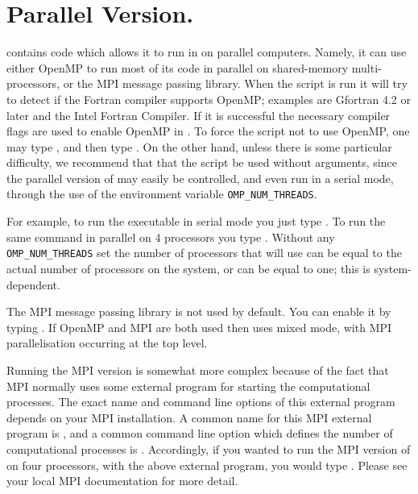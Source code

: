 \documentclass[12pt]{report}
\begin{document}
\section{ Parallel Version.} \label{sec:Parallel}
\AUTO contains code which allows
it to run in on parallel computers.  Namely,
it can use either OpenMP to run most of its code in parallel
on shared-memory multi-processors, or the MPI message passing
library.
When the  script is run it will try to
detect if the Fortran compiler supports OpenMP; examples
are Gfortran 4.2 or later and the Intel Fortran Compiler.
If it is successful the necessary compiler flags are used
to enable OpenMP in \AUTO.
To force the  script not to use OpenMP,
one may type ,
and then type .
On the other hand, unless there is some
particular difficulty, we recommend that that the 
 script be used without arguments, since the
parallel version of \AUTO may easily be controlled,
and even run in a serial mode,  
through the use of the environment variable {\tt OMP\_NUM\_THREADS}.

For example, to run the \AUTO executable 
in serial mode you just type .
To run the same command in parallel on 4 processors you type 
. Without any {\tt OMP\_NUM\_THREADS}
set the number of processors that \AUTO will use can be equal to the
actual number of processors on the system, or can be equal to one;
this is system-dependent.

The MPI message passing library is not used by default. You can enable it
by typing  . If OpenMP and MPI are
both used then \AUTO uses mixed mode, with MPI parallelisation
occurring at the top level.

Running the MPI version is somewhat more complex because of the fact
that MPI normally uses some external program for starting the
computational processes.  The exact name and command line options of
this external program depends on your MPI installation.  A common name
for this MPI external program is , and a common command
line option which defines the number of computational processes is .  Accordingly, if you wanted to run the MPI version of \AUTO
on four processors, with the above external program, you would
type .  Please see your local MPI
documentation for more detail.
\end{document}

